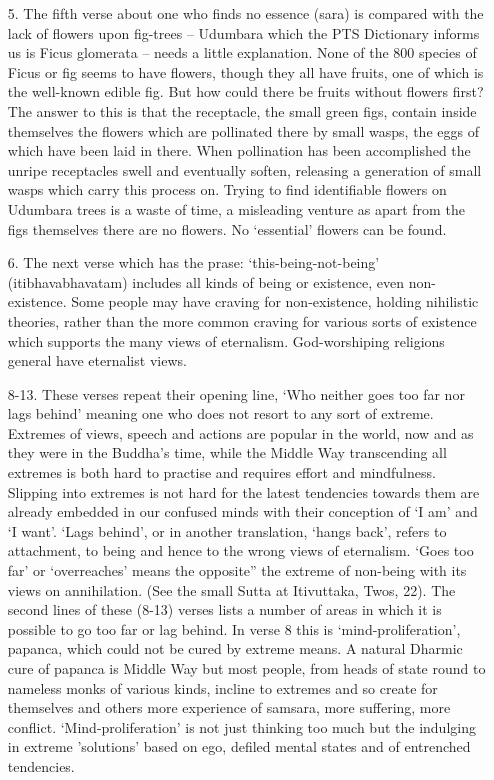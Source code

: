 \begin{itemize}
   
\item[5.] The fifth verse about one who finds no essence (sara) is compared with the lack of flowers upon fig-trees – Udumbara which the PTS Dictionary informs us is Ficus glomerata – needs a little explanation. None of the 800 species of Ficus or fig seems to have flowers, though they all have fruits, one of which is the well-known edible fig. But how could there be fruits without flowers first? The answer to this is that the receptacle, the small green figs, contain inside themselves the flowers which are pollinated there by small wasps, the eggs of which have been laid in there. When pollination has been accomplished the unripe receptacles swell and eventually soften, releasing a generation of small wasps which carry this process on. Trying to find identifiable flowers on Udumbara trees is a waste of time, a misleading venture as apart from the figs themselves there are no flowers. No `essential' flowers can be found.
   
\item[6.] The next verse which has the prase: `this-being-not-being' (itibhavabhavatam) includes all kinds of being or existence, even non-existence. Some people may have craving for non-existence, holding nihilistic theories, rather than the more common craving for various sorts of existence which supports the many views of eternalism. God-worshiping religions general have eternalist views.
   
\item[8-13.] These verses repeat their opening line, `Who neither goes too far nor lags behind' meaning one who does not resort to any sort of extreme. Extremes of views, speech and actions are popular in the world, now and as they were in the Buddha's time, while the Middle Way transcending all extremes is both hard to practise and requires effort and mindfulness. Slipping into extremes is not hard for the latest tendencies towards them are already embedded in our confused minds with their conception of `I am' and `I want'. `Lags behind', or in another translation, `hangs back', refers to attachment, to being and hence to the wrong views of eternalism. `Goes too far' or `overreaches' means the opposite” the extreme of non-being with its views on annihilation. (See the small Sutta at Itivuttaka, Twos, 22). The second lines of these (8-13) verses lists a number of areas in which it is possible to go too far or lag behind. In verse 8 this is `mind-proliferation', papanca, which could not be cured by extreme means. A natural Dharmic cure of papanca is Middle Way but most people, from heads of state round to nameless monks of various kinds, incline to extremes and so create for themselves and others more experience of samsara, more suffering, more conflict. `Mind-proliferation' is not just thinking too much but the indulging in extreme 'solutions' based on ego, defiled mental states and of entrenched tendencies.
   

\end{itemize}
